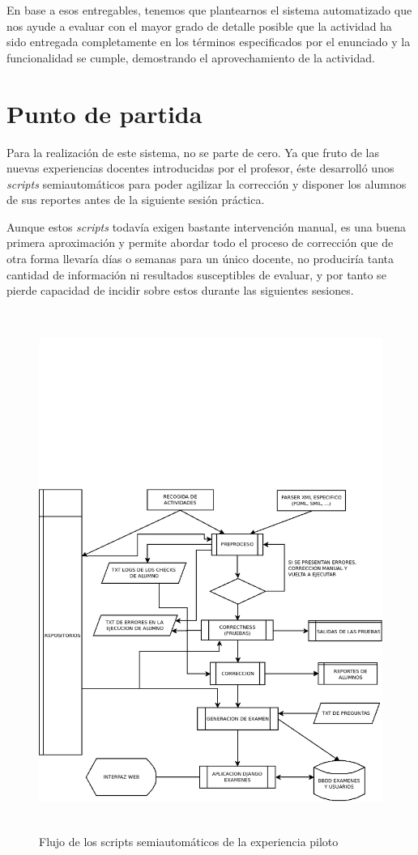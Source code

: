 En base a esos entregables, tenemos que plantearnos el sistema automatizado que nos ayude a evaluar con el mayor grado de detalle posible que la actividad ha sido entregada completamente en los términos especificados por el enunciado y la funcionalidad se cumple, demostrando el aprovechamiento de la actividad.



\section{Punto de partida}
\label{sec:puntp_partida}


Para la realización de este sistema, no se parte de cero. Ya que fruto de las nuevas experiencias docentes introducidas por el profesor, éste desarrolló unos \textit{scripts} semiautomáticos para poder agilizar la corrección y disponer los alumnos de sus reportes antes de la siguiente sesión práctica.


Aunque estos \textit{scripts} todavía exigen bastante intervención manual, es una buena primera aproximación y permite abordar todo el proceso de corrección que de otra forma llevaría días o semanas para un único docente, no produciría tanta cantidad de información ni resultados susceptibles de evaluar, y por tanto se pierde capacidad de incidir sobre estos durante las siguientes sesiones.

\begin{figure}[H]
   \centering
   \includegraphics[height=17cm]{img/Diagram1_flujo_semiautomatico}
   \caption{Flujo de los scripts semiautomáticos de la experiencia piloto}
   \label{figura:flujo_semiautomatico}
\end{figure}


